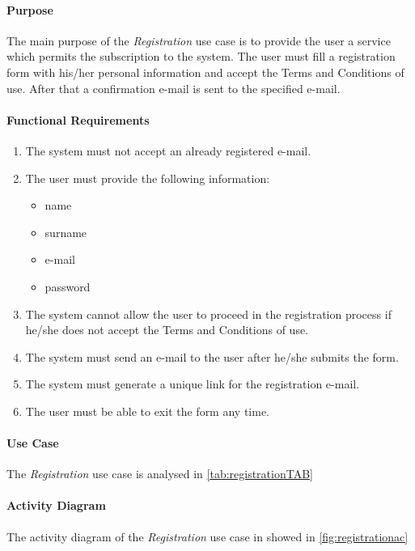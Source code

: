 \paragraph*{Purpose\\}
The main purpose of the \emph{Registration} use case is to provide the user a service which permits the subscription to the system. The user must fill a registration form with his/her personal information and accept the Terms and Conditions of use. After that a confirmation e-mail is sent to the specified e-mail.
\paragraph{Functional Requirements}
\begin{enumerate}[label=R.\arabic*:]
	\item The system must not accept an already registered e-mail.
	\item The user must provide the following information:
	\begin{itemize}
		\item name
		\item surname
		\item e-mail
		\item password
	\end{itemize}
	\item The system cannot allow the user to proceed in the registration process if he/she does not accept the Terms and Conditions of use.
	\item The system must send an e-mail to the user after he/she submits the form.	
	\item The system must generate a unique link for the registration e-mail.
	\item The user must be able to exit the form any time.
\end{enumerate}

\paragraph*{Use Case\\}
The \emph{Registration} use case is analysed in \autoref{tab:registrationTAB}
\paragraph*{Activity Diagram\\}
The activity diagram of the \emph{Registration} use case in showed in \autoref{fig:registrationac}
